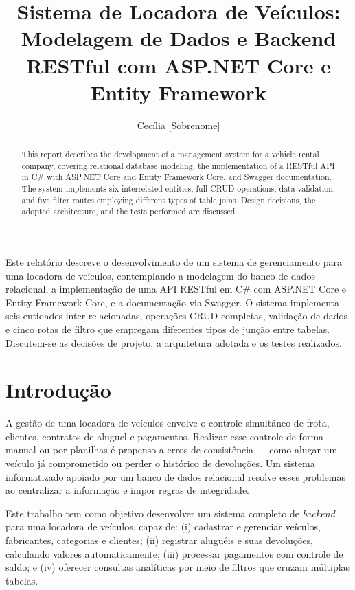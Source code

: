 \documentclass[12pt]{article}
\title{Sistema de Locadora de Veículos: \\ Modelagem de Dados e Backend RESTful com ASP.NET Core e Entity Framework}
\author{Cecília [Sobrenome]\inst{1}}
\begin{document}
\maketitle

\begin{resumo}
Este relatório descreve o desenvolvimento de um sistema de gerenciamento para uma locadora de veículos, contemplando a modelagem do banco de dados relacional, a implementação de uma API RESTful em C\# com ASP.NET Core e Entity Framework Core, e a documentação via Swagger. O sistema implementa seis entidades inter-relacionadas, operações CRUD completas, validação de dados e cinco rotas de filtro que empregam diferentes tipos de junção entre tabelas. Discutem-se as decisões de projeto, a arquitetura adotada e os testes realizados.
\end{resumo}

\begin{abstract}
This report describes the development of a management system for a vehicle rental company, covering relational database modeling, the implementation of a RESTful API in C\# with ASP.NET Core and Entity Framework Core, and Swagger documentation. The system implements six interrelated entities, full CRUD operations, data validation, and five filter routes employing different types of table joins. Design decisions, the adopted architecture, and the tests performed are discussed.
\end{abstract}

\section{Introdução}

A gestão de uma locadora de veículos envolve o controle simultâneo de frota, clientes, contratos de aluguel e pagamentos. Realizar esse controle de forma manual ou por planilhas é propenso a erros de consistência --- como alugar um veículo já comprometido ou perder o histórico de devoluções. Um sistema informatizado apoiado por um banco de dados relacional resolve esses problemas ao centralizar a informação e impor regras de integridade.

Este trabalho tem como objetivo desenvolver um sistema completo de \emph{backend} para uma locadora de veículos, capaz de: (i) cadastrar e gerenciar veículos, fabricantes, categorias e clientes; (ii) registrar aluguéis e suas devoluções, calculando valores automaticamente; (iii) processar pagamentos com controle de saldo; e (iv) oferecer consultas analíticas por meio de filtros que cruzam múltiplas tabelas.
\end{document}
